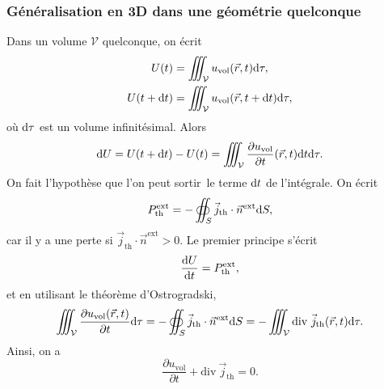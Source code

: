         \subsubsection{Généralisation en 3D dans une géométrie quelconque}
            
            Dans un volume $\mathcal{V}$ quelconque, on écrit
            \begin{equation*}
                \begin{aligned}
                    U(t)&=\iiint_{\mathcal{V}}u_{\text{vol}}(\vec{r},t)\mathrm{d}\tau,\\
                    U(t+\mathrm{d} t)&=\iiint_{\mathcal{V}}u_{\text{vol}}(\vec{r},t+\mathrm{d} t)\mathrm{d}\tau,\\
                \end{aligned}
            \end{equation*}
            où $\mathrm{d}\tau$ est un volume infinitésimal. Alors
            \begin{equation*}
                \mathrm{d} U=U(t+\mathrm{d} t)-U(t)=\iiint_{\mathcal{V}}\frac{\partial u_{\text{vol}}}{\partial t}(\vec{r},t)\mathrm{d} t\mathrm{d}\tau.
            \end{equation*}
            On fait l'hypothèse que l'on peut \og sortir\fg~le terme $\mathrm{d} t$ de l'intégrale. On écrit
            \begin{equation*}
                P_{\text{th}}^{\text{ext}}=-\oiint_{S}\vec{j}_{\text{th}}\cdot\vec{n}^{\text{ext}}\mathrm{d} S,
            \end{equation*}
            car il y a une perte si $\vec{j}_{\text{th}}\cdot\vec{n}^{\text{ext}}>0$. Le premier principe s'écrit 
            \begin{equation*}
                \frac{\mathrm{d} U}{\mathrm{d} t}=P_{\text{th}}^{\text{ext}},
            \end{equation*}
            et en utilisant le théorème d'Ostrogradski,
            \begin{equation*}
                \iiint_{\mathcal{V}}\frac{\partial u_{\text{vol}}(\vec{r},t)}{\partial t}\mathrm{d}\tau=-\oiint_{S}\vec{j}_{\text{th}}\cdot\vec{n}^{\text{ext}}\mathrm{d} S=-\iiint_{\mathcal{V}}\mathrm{div}~\vec{j}_{\text{th}}(\vec{r},t)\mathrm{d}\tau.
            \end{equation*}
            Ainsi, on a 
            \begin{equation*}
                \boxed{
                    \frac{\partial u_{\text{vol}}}{\partial t}+\mathrm{div}~\vec{j}_{\text{th}}=0.
                }
            \end{equation*}

